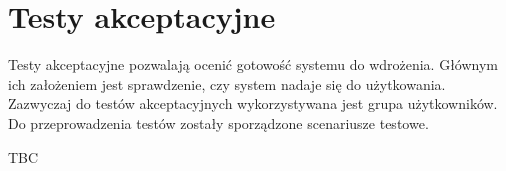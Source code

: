 \section{Testy akceptacyjne}

Testy akceptacyjne pozwalają ocenić gotowość systemu do wdrożenia. Głównym ich założeniem jest sprawdzenie, czy system nadaje się do użytkowania. Zazwyczaj do testów akceptacyjnych wykorzystywana jest grupa użytkowników.\cite{acceptanceTesting} Do przeprowadzenia testów zostały sporządzone scenariusze testowe.


TBC